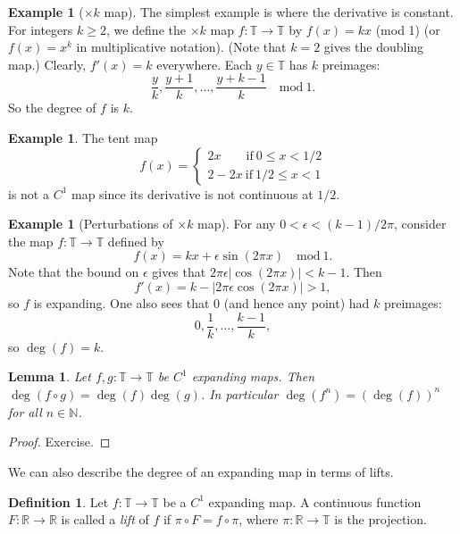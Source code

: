 \documentclass[12pt]{article}
\newtheorem{lemma}[theorem]{Lemma}
\theoremstyle{definition}
\newtheorem{definition}[theorem]{Definition}
\newtheorem{example}[theorem]{Example}
\theoremstyle{remark}
\begin{document}



\bigskip

\begin{example}[$\times k$ map]
The simplest example is where the derivative is constant. For integers $k \ge 2$, we define the $\times k$ map
$f: \mathbb T \to \mathbb T$ by $f(x)=kx$ (mod 1) (or $f(x)=x^k$ in multiplicative notation). 
(Note that $k=2$ gives the doubling map.) 
Clearly, $f'(x)=k$ everywhere.
Each $y \in \mathbb T$ has $k$ preimages:
\[
\frac{y}{k}, \frac{y+1}{k}, \ldots, \frac{y+k-1}{k} \quad \text{mod} \ 1.
\]
So the degree of $f$ is $k$.
\end{example}

\begin{example} The tent map
\[
f(x) = \begin{cases} 2x \qquad  \text{if} \ 0 \le x < 1/2 \\
2-2x \ \text{if} \ 1/2 \le x <1
\end{cases}
\]
is not a $C^1$ map since its derivative is not continuous at $1/2$. 
\end{example}


\begin{example}[Perturbations of $\times k$ map]
For any $0<\epsilon< (k-1)/2\pi$, consider the map $f : \mathbb T \to \mathbb T$ defined by
\[
f(x) = kx + \epsilon \sin(2\pi x) \quad \text{mod} \ 1.
\]
Note that the bound on $\epsilon$ gives that $2\pi \epsilon |\cos(2\pi x)|<k-1$.
Then 
\[
f'(x) = k - |2\pi \epsilon\cos(2\pi x)| 
>1,
\]
so $f$ is expanding.
One also sees that $0$ (and hence any point) had $k$ preimages:
\[
0,\frac{1}{k},\ldots,\frac{k-1}{k},
\]
so $\deg(f)=k$.
\end{example}

\begin{lemma}
Let $f,g : \mathbb T \to \mathbb T$ be $C^1$ expanding maps. Then 
$\deg(f \circ g) = \deg(f) \deg(g)$. In particular $\deg(f^n) = (\deg(f))^n$ for all $n \in \mathbb N$.
\end{lemma}

\begin{proof}
Exercise.
\end{proof}

We can also describe the degree of an expanding map in terms of lifts.

\begin{definition}
Let $f : \mathbb T \to \mathbb T$ be a $C^1$ expanding map. A continuous 
function $F : \mathbb R \to \mathbb R$ is called a {\it lift}
of $f$ if $\pi \circ F = f \circ \pi$, where $\pi : \mathbb R \to \mathbb T$ is the projection.
\end{definition}
\end{document}
